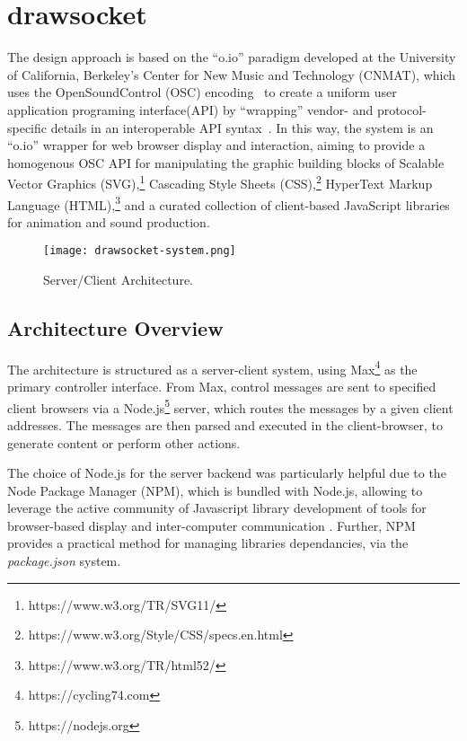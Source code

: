 \section{drawsocket}\label{sec:drawsocket}
The \drawsocket design approach is based on the ``o.io'' paradigm developed at the University of California, Berkeley's Center for New Music and Technology (CNMAT), which uses the OpenSoundControl (OSC) encoding~\cite{wright:osc} to create a uniform user application programing interface(API) by ``wrapping'' vendor- and protocol-specific details in an interoperable API syntax~\cite{freed2014io, maccallum2015dynamic}.
In this way, the \drawsocket system is an ``o.io'' wrapper for web browser display and interaction, aiming to provide a homogenous OSC API for manipulating the graphic building blocks of Scalable Vector Graphics (SVG),\footnote{https://www.w3.org/TR/SVG11/} Cascading Style Sheets (CSS),\footnote{https://www.w3.org/Style/CSS/specs.en.html} HyperText Markup Language (HTML),\footnote{https://www.w3.org/TR/html52/} and a curated collection of client-based JavaScript libraries for animation and sound production.

\begin{figure*}[]
\centering
\texttt{[image: drawsocket-system.png]}
\caption{\drawsocket Server/Client Architecture. 
\label{fig:drawsocket-arch}}
\end{figure*}

\subsection{Architecture Overview}
The \drawsocket architecture is structured as a server-client system, using Max\footnote{https://cycling74.com} as the primary controller interface. 
From Max, control messages are sent to specified client browsers via a Node.js\footnote{https://nodejs.org} server, which routes the messages by a given client addresses.
The messages are then parsed and executed in the client-browser, to generate content or perform other actions.

The choice of Node.js for the server backend was particularly helpful due to the Node Package Manager (NPM), which is bundled with Node.js, allowing \drawsocket to leverage the active community of Javascript library development of tools for browser-based display and inter-computer communication \cite{trockman2018adding}. 
Further, NPM provides a practical method for managing libraries dependancies, via the \textit{package.json} system.

